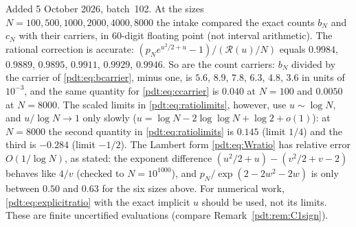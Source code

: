 \begin{remark}\label{pdt:rem:slowbinary}
Added 5 October 2026, batch~102. At the sizes
$N=100,500,1000,2000,4000,8000$ the intake compared the exact counts $b_N$
and $c_N$ with their carriers, in 60-digit floating point (not interval
arithmetic). The rational correction is
accurate: $(p_Ne^{u^2/2+u}-1)/(\mathcal R(u)/N)$ equals $0.9984$, $0.9889$,
$0.9895$, $0.9911$, $0.9929$, $0.9946$. So are the count carriers:
$b_N$ divided by the carrier of \eqref{pdt:eq:bcarrier}, minus one, is
$5.6$, $8.9$, $7.8$, $6.3$, $4.8$, $3.6$ in units of $10^{-3}$, and the same
quantity for \eqref{pdt:eq:ccarrier} is $0.040$ at $N=100$ and $0.0050$ at
$N=8000$.
The scaled limits in \eqref{pdt:eq:ratiolimits}, however, use $u\sim\log N$,
and $u/\log N\to1$ only slowly ($u=\log N-2\log\log N+\log2+o(1)$): at
$N=8000$ the second quantity in \eqref{pdt:eq:ratiolimits} is $0.145$
(limit $1/4$) and the third is $-0.284$ (limit $-1/2$). The Lambert form
\eqref{pdt:eq:Wratio} has relative error $O(1/\log N)$, as stated: the
exponent difference $(u^2/2+u)-(v^2/2+v-2)$ behaves like $4/v$ (checked to
$N=10^{1000}$), and $p_N/\exp(2-2w^2-2w)$ is only between $0.50$ and $0.63$
for the six sizes above. For numerical work, \eqref{pdt:eq:explicitratio}
with the exact implicit $u$ should be used, not its limits. These are
finite uncertified evaluations (compare Remark~\ref{pdt:rem:C1sign}).
\end{remark}
